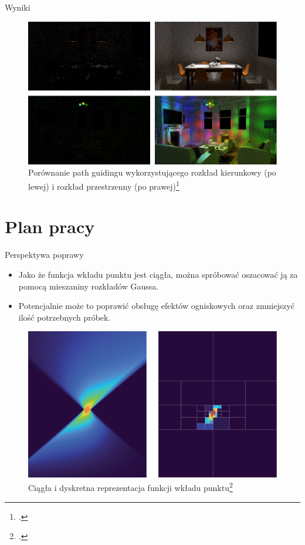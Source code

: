\documentclass{beamer}
\begin{document}
\begin{frame}{Wyniki}
    \begin{figure}
        \centering
        \includegraphics[width=0.8\linewidth]{img/ruppert_vs_rath.png}
        \caption{Porównanie path guidingu wykorzystującego rozkład kierunkowy (po lewej) i rozkład przestrzenny (po prawej)\footcite{Focal_Guiding}}
        \label{fig:enter-label}
    \end{figure}
\end{frame}

\section{Plan pracy}
\begin{frame}{Perspektywa poprawy}
\begin{itemize}
    \item Jako że funkcja wkładu punktu jest ciągła, można spróbować oszacować ją za pomocą mieszaniny rozkładów Gaussa.
    \item Potencjalnie może to poprawić obsługę efektów ogniskowych oraz zmniejszyć ilość potrzebnych próbek.
\end{itemize}
\begin{figure}
    \centering
    \includegraphics[width=0.5\linewidth]{img/descrite_vs_continuous.png}
    \caption{Ciągła i dyskretna reprezentacja funkcji wkładu punktu\footcite{Focal_Guiding}}
    \label{fig:enter-label}
\end{figure}
\end{frame}
\end{document}
